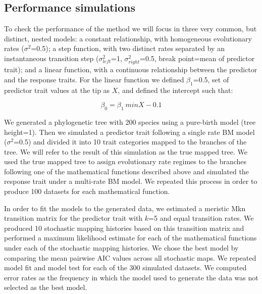 \subsection{Performance simulations}

To check the performance of the method we will focus in three very common, but distinct, nested models: a constant relationship, with homogeneous evolutionary rates ($\sigma^{2}$=0.5); a step function, with two distinct rates separated by an instantaneous transition step ($\sigma^{2}_{left}$=1, $\sigma^{2}_{right}$=0.5, break point=mean of predictor trait); and a linear function, with a continuous relationship between the predictor and the response traits. For the linear function we defined $\beta_{1}$=0.5, set of predictor trait values at the tip as $X$, and defined the intercept such that:

\begin{equation}
\beta_{0} = \beta_{1} \ min X - 0.1
\end{equation}

We generated a phylogenetic tree with 200 species using a pure-birth model (tree height=1). Then we simulated a predictor trait following a single rate BM model ($\sigma^{2}$=0.5) and divided it into 10 trait categories mapped to the branches of the tree. We will refer to the result of this simulation as the true mapped tree. We used the true mapped tree to assign evolutionary rate regimes to the branches following one of the mathematical functions described above and simulated the response trait under a multi-rate BM model. We repeated this process in order to produce 100 datasets for each mathematical function.

In order to fit the models to the generated data, we estimated a meristic Mkn transition matrix for the predictor trait with $\mathit{k}$=5 and equal transition rates. We produced 10 stochastic mapping histories based on this transition matrix and performed a maximum likelihood estimate for each of the mathematical functions under each of the stochastic mapping histories. We chose the best model by comparing the mean pairwise AIC values across all stochastic maps. We repeated model fit and model test for each of the 300 simulated datasets. We computed error rates as the frequency in which the model used to generate the data was not selected as the best model.

